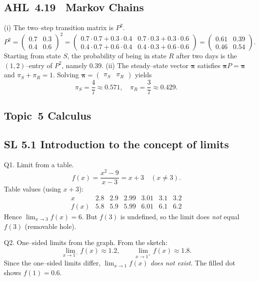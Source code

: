 \documentclass[11pt]{article}
\def\textbf#1{#1}%
\newcommand{\tocsubsection}[1]{\subsection{#1}}
\begin{document}
\tocsubsection{AHL 4.19 \; Markov Chains}

\begin{solution}
(i) The two–step transition matrix is $P^2$.
\[P^2=\begin{pmatrix}0.7&0.3\\0.4&0.6\end{pmatrix}^2
  =\begin{pmatrix}0.7\cdot0.7+0.3\cdot0.4 & 0.7\cdot0.3+0.3\cdot0.6\\
                 0.4\cdot0.7+0.6\cdot0.4 & 0.4\cdot0.3+0.6\cdot0.6
    \end{pmatrix}
  =\begin{pmatrix}0.61 & 0.39\\0.46 & 0.54\end{pmatrix}.
\]
Starting from state $S$, the probability of being in state $R$ after two
days is the $(1,2)$–entry of $P^2$, namely $0.39$.  (ii) The steady–state
vector $\boldsymbol{\pi}$ satisfies $\boldsymbol{\pi}P=\boldsymbol{\pi}$ and
$\pi_S+\pi_R=1$.  Solving
$\boldsymbol{\pi}=\begin{pmatrix}\pi_S & \pi_R\end{pmatrix}$ yields
\[\pi_S=\frac{4}{7}\approx0.571,\quad\pi_R=\frac{3}{7}\approx0.429.
\]
\end{solution}




\tocsubsection{Topic 5 Calculus}
\tocsubsection{SL 5.1 Introduction to the concept of limits}


\begin{solution}
\textbf{Q1. Limit from a table.}
\[
f(x)=\frac{x^{2}-9}{x-3}=x+3\quad(x\ne3).
\]
Table values (using $x+3$):
\[
\begin{array}{c|cccccc}
x & 2.8 & 2.9 & 2.99 & 3.01 & 3.1 & 3.2\\\hline
f(x) & 5.8 & 5.9 & 5.99 & 6.01 & 6.1 & 6.2
\end{array}
\]
Hence $\displaystyle\lim_{x\to3}f(x)=\boxed{6}$.  
But $f(3)$ is undefined, so the limit does \emph{not} equal $f(3)$ (removable hole).
\end{solution}

\begin{solution}
\textbf{Q2. One–sided limits from the graph.}
From the sketch:
\[
\lim_{x\to1^-}f(x)\approx \boxed{1.2},\qquad
\lim_{x\to1^+}f(x)\approx \boxed{1.8}.
\]
Since the one–sided limits differ, $\displaystyle\lim_{x\to1}f(x)$ \emph{does not exist}.  
The filled dot shows $f(1)=\boxed{0.6}$.
\end{solution}
\end{document}
